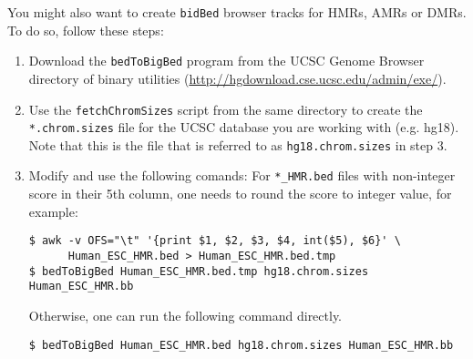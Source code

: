 \documentclass[10pt]{article}
\newcommand{\prog}[1]{\texttt{#1}}
\newcommand{\fn}[1]{\texttt{#1}}
\begin{document}
\noindent
You might also want to create \fn{bidBed} browser tracks for HMRs,
AMRs or DMRs. To do so, follow these steps:
\begin{enumerate}
\item Download the \prog{bedToBigBed} program from the UCSC Genome
  Browser directory of binary utilities
  (\url{http://hgdownload.cse.ucsc.edu/admin/exe/}).
\item Use the \fn{fetchChromSizes} script from the same directory to
  create the \fn{*.chrom.sizes} file for the UCSC database you are
  working with (e.g. hg18). Note that this is the file that is
  referred to as \fn{hg18.chrom.sizes} in step 3.
\item Modify and use the following comands: For \fn{*\_HMR.bed} files
  with non-integer score in their 5th column, one needs to round the
  score to integer value, for example:
\begin{verbatim}
$ awk -v OFS="\t" '{print $1, $2, $3, $4, int($5), $6}' \
      Human_ESC_HMR.bed > Human_ESC_HMR.bed.tmp
$ bedToBigBed Human_ESC_HMR.bed.tmp hg18.chrom.sizes Human_ESC_HMR.bb
\end{verbatim}
Otherwise, one can run the following command directly.
\begin{verbatim}
$ bedToBigBed Human_ESC_HMR.bed hg18.chrom.sizes Human_ESC_HMR.bb
\end{verbatim}
\end{enumerate}
\end{document}
